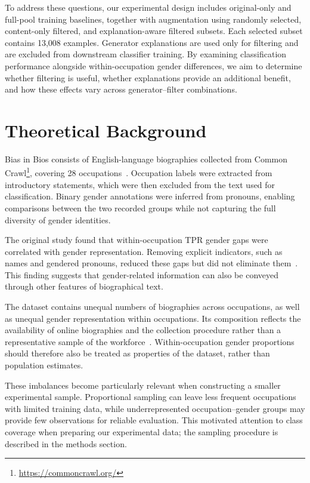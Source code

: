 \documentclass[sigconf]{acmart}
\begin{document}
To address these questions, our experimental design includes original-only and full-pool training baselines, together with augmentation using randomly selected, content-only filtered, and explanation-aware filtered subsets. Each selected subset contains 13,008 examples. Generator explanations are used only for filtering and are excluded from downstream classifier training. By examining classification performance alongside within-occupation gender differences, we aim to determine whether filtering is useful, whether explanations provide an additional benefit, and how these effects vary across generator--filter combinations.

\section{Theoretical Background}
\label{sec:background}
Bias in Bios consists of English-language biographies collected from Common Crawl\footnote{\url{https://commoncrawl.org/}}, covering 28 occupations~\cite{dearteaga2019bios}. Occupation labels were extracted from introductory statements, which were then excluded from the text used for classification. Binary gender annotations were inferred from pronouns, enabling comparisons between the two recorded groups while not capturing the full diversity of gender identities.

The original study found that within-occupation TPR gender gaps were correlated with gender representation. Removing explicit indicators, such as names and gendered pronouns, reduced these gaps but did not eliminate them~\cite{dearteaga2019bios}. This finding suggests that gender-related information can also be conveyed through other features of biographical text.

The dataset contains unequal numbers of biographies across occupations, as well as unequal gender representation within occupations. Its composition reflects the availability of online biographies and the collection procedure rather than a representative sample of the workforce~\cite{dearteaga2019bios}. Within-occupation gender proportions should therefore also be treated as properties of the dataset, rather than population estimates.

These imbalances become particularly relevant when constructing a smaller experimental sample. Proportional sampling can leave less frequent occupations with limited training data, while underrepresented occupation--gender groups may provide few observations for reliable evaluation. This motivated attention to class coverage when preparing our experimental data; the sampling procedure is described in the methods section.
\end{document}
